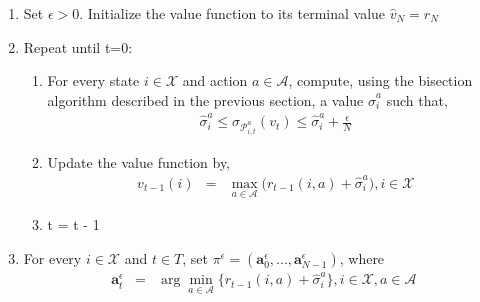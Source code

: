 \begin{enumerate}
	\item Set $\epsilon > 0$. Initialize the value function to its terminal value $\hat{v}_N = r_N$
	\item Repeat until t=0:
	\begin{enumerate}
		\item For every state $i \in \mathcal{X}$ and action $a \in \mathcal{A}$, compute, using the bisection algorithm described in the previous section, a value $\hat{\sigma}^{a}_i$ such that,
		\begin{eqnarray*}
		\hat{\sigma}^{a}_i \leq \sigma_{\mathcal{P}^{a}_{i,t}}(v_{t}) \leq \hat{\sigma}^{a}_i + \frac{\epsilon}{N}
		\end{eqnarray*}
		\item Update the value function by,
		\begin{eqnarray*}
		v_{t-1}(i) &=& \max_{a \in \mathcal{A}} \bigg(r_{t-1}(i,a) + \hat{\sigma}^{a}_i\bigg), i \in \mathcal{X}
		\end{eqnarray*}
		\item t = t - 1
	\end{enumerate}
	\item For every $i \in \mathcal{X}$ and $t \in T$, set $\pi^{\epsilon} = (\textbf{a}^{\epsilon}_0, ..., \textbf{a}^{\epsilon}_{N-1})$, where
	\begin{eqnarray*}
	\textbf{a}^{\epsilon}_t &=& \arg \min_{a \in \mathcal{A}} \big\{r_{t-1}(i,a) + \hat{\sigma}^{a}_i\big\}, i \in \mathcal{X}, a \in \mathcal{A}
	\end{eqnarray*}
\end{enumerate}